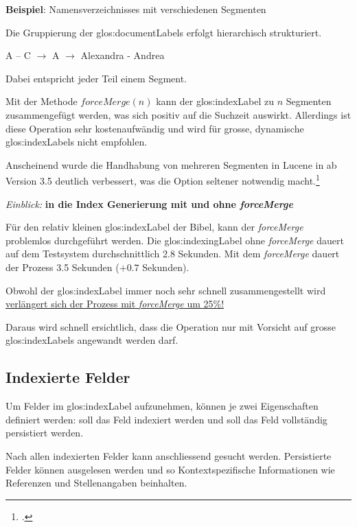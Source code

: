 \begin{framed}
	\textbf{Beispiel}: Namensverzeichnisses mit verschiedenen Segmenten

	Die Gruppierung der \glspl{glos:documentLabel} erfolgt hierarchisch strukturiert.

	A -- C $\rightarrow$ A $\rightarrow$ Alexandra - Andrea

	Dabei entspricht jeder Teil einem Segment.
\end{framed}

Mit der Methode $forceMerge(n)$ kann der \gls{glos:indexLabel} zu $n$ Segmenten zusammengefügt werden, was sich positiv auf die Suchzeit auswirkt. Allerdings ist diese Operation sehr kostenaufwändig und wird für grosse, dynamische \glspl{glos:indexLabel} nicht empfohlen.

Anscheinend wurde die Handhabung von mehreren Segmenten in Lucene in ab Version 3.5 deutlich verbessert, was die Option seltener notwendig macht.\footcite{LUCENE-rename_optimize_to_a_less_cool-sounding_name_ASF_JIRA_2016-05-08}

\begin{framed}
	\textit{Einblick:} \textbf{in die Index Generierung mit und ohne \textit{forceMerge}}

	Für den relativ kleinen \gls{glos:indexLabel} der Bibel, kann der \textit{forceMerge} problemlos durchgeführt werden.
	Die \gls{glos:indexingLabel} ohne \textit{forceMerge} dauert auf dem Testsystem durchschnittlich 2.8 Sekunden. Mit dem \textit{forceMerge} dauert der Prozess 3.5 Sekunden ($+0.7$ Sekunden).

	Obwohl  der \gls{glos:indexLabel} immer noch sehr schnell zusammengestellt wird \ul{verlängert sich der Prozess mit \textit{forceMerge} um 25\%!}

	Daraus wird schnell ersichtlich, dass die Operation nur mit Vorsicht auf grosse \glspl{glos:indexLabel} angewandt werden darf.
\end{framed}


\subsection{Indexierte Felder}
Um Felder im \gls{glos:indexLabel} aufzunehmen, können je zwei Eigenschaften definiert werden: soll das Feld indexiert werden und soll das Feld vollständig persistiert werden.

Nach allen indexierten Felder kann anschliessend gesucht werden. Persistierte Felder können ausgelesen werden und so Kontextspezifische Informationen wie Referenzen und Stellenangaben beinhalten.

